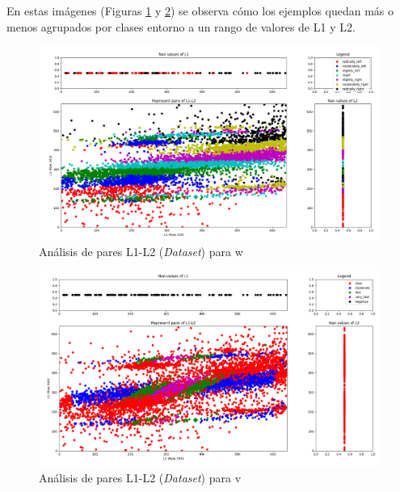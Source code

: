 En estas imágenes (Figuras \ref{fig.L1_L2_dataset_w} y \ref{fig.L1_L2_dataset_v}) se observa cómo los ejemplos quedan más o menos agrupados por clases entorno a un rango de valores de L1 y L2. \\

\begin{figure}
  \begin{center}
    \includegraphics[width=1\textwidth]{figures/Infraestructura/L1_L2_dataset3_w.png}
		\caption{Análisis de pares L1-L2 (\textit{Dataset}) para w}
		\label{fig.L1_L2_dataset_w}
		\end{center}
\end{figure}

\begin{figure}
  \begin{center}
    \includegraphics[width=1\textwidth]{figures/Infraestructura/L1_L2_dataset3_v.png}
		\caption{Análisis de pares L1-L2 (\textit{Dataset}) para v}
		\label{fig.L1_L2_dataset_v}
		\end{center}
\end{figure}


